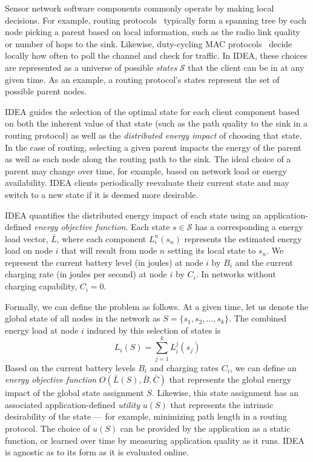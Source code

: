Sensor network software components commonly operate by making local
decisions. For example, routing protocols~\cite{ctp,awoo-multihop} typically
form a spanning tree by each node picking a parent based on local
information, such as the radio link quality or number of hops to the sink.
Likewise, duty-cycling MAC protocols~\cite{bmac-sensys04} decide locally how
often to poll the channel and check for traffic. In IDEA, these choices are
represented as a universe of possible \textit{states} $\mathcal{S}$ that the
client can be in at any given time. As an example, a routing protocol's
states represent the set of possible parent nodes.

IDEA guides the selection of the optimal state for each client component
based on both the inherent value of that state (such as the path quality to
the sink in a routing protocol) as well as the \textit{distributed energy
impact} of choosing that state. In the case of routing, selecting a given
parent impacts the energy of the parent as well as each node along the
routing path to the sink. The ideal choice of a parent may change over time,
for example, based on network load or energy availability. IDEA clients
periodically reevaluate their current state and may switch to a new state if
it is deemed more desirable.

IDEA quantifies the distributed energy impact of each state using an
application-defined \textit{energy objective function}. Each state $s \in
\mathcal{S}$ has a corresponding a energy load vector, $\bar{L}$, where each
component $L_i^n(s_n)$ represents the estimated energy load on node $i$ that
will result from node $n$ setting its local state to $s_n$. We represent the
current battery level (in joules) at node $i$ by $B_i$ and the current
charging rate (in joules per second) at node $i$ by $C_i$. In networks
without charging capability, $C_i = 0$.

Formally, we can define the problem as follows. At a given time, let us
denote the global state of all nodes in the network as $S = \{ s_1, s_2,
\ldots, s_k \}$. The combined energy load at node $i$ induced by this
selection of states is \[ L_i(S) = \sum_{j=1}^k L_i^j(s_j) \] Based on the
current battery levels $B_i$ and charging rates $C_i$, we can define an
\textit{energy objective function} $O(\bar{L}(S), \bar{B}, \bar{C})$ that
represents the global energy impact of the global state assignment $S$.
Likewise, this state assignment has an associated application-defined
\textit{utility} $u(S)$ that represents the intrinsic desirability of the
state --- for example, minimizing path length in a routing protocol. The
choice of $u(S)$ can be provided by the application as a static function, or
learned over time by measuring application quality as it runs. IDEA is
agnostic as to its form as it is evaluated online. 

